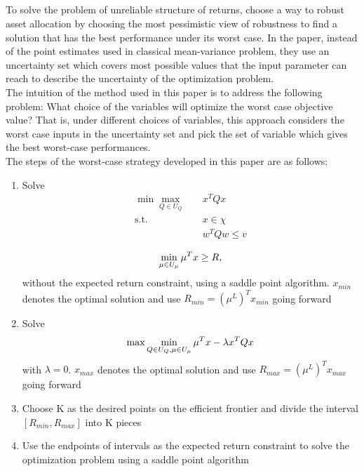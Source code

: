 \subsection{}
To solve the problem of unreliable structure of returns, \cite{tütüncü_koenig_2004} choose a way to robust asset allocation by choosing the most pessimistic view of robustness to find a solution that has the best performance under its worst case. In the paper, instead of the point estimates used in classical mean-variance problem, they use an uncertainty set which covers most possible values that the input parameter can reach to describe the uncertainty of the optimization problem.\\
The intuition of the method used in this paper is to address the following problem: What choice of the variables will optimize the worst case objective value? That is, under different choices of variables, this approach considers the worst case inputs in the uncertainty set and pick the set of variable which gives the best worst-case performances.\\
The steps of the worst-case strategy developed in this paper are as follows:
\begin{enumerate}
  \item Solve 
    \begin{equation}
    \begin{aligned}
        \min \max_{Q\in U_Q} \quad & x^{T}Qx\\
        \textrm{s.t.} \quad & x\in \chi\\
        & w^TQw \leq v\\
    \end{aligned}
    \end{equation}
    \begin{equation}
    \min_{\mu \in U_\mu} \mu^Tx\geq R\textrm{,}\\
    \end{equation}
    without the expected return constraint, using a saddle point algorithm. $x_{min}$ denotes the optimal solution and use $R_{min}=(\mu^L)^Tx_{min}$ going forward
  \item Solve
     \begin{equation}
        \max \min_{Q\in U_Q,\mu\in U_\mu} \mu^Tx-\lambda x^TQx\\
     \end{equation}
    with $\lambda=0$. $x_{max}$ denotes the optimal solution and use $R_{max}=(\mu^L)^Tx_{max}$ going forward
  \item Choose K as the desired points on the efficient frontier and divide the interval $[R_{min},R_{max}]$ into K pieces
  \item Use the endpoints of intervals as the expected return constraint to solve the optimization problem using a saddle point algorithm
\end{enumerate}
